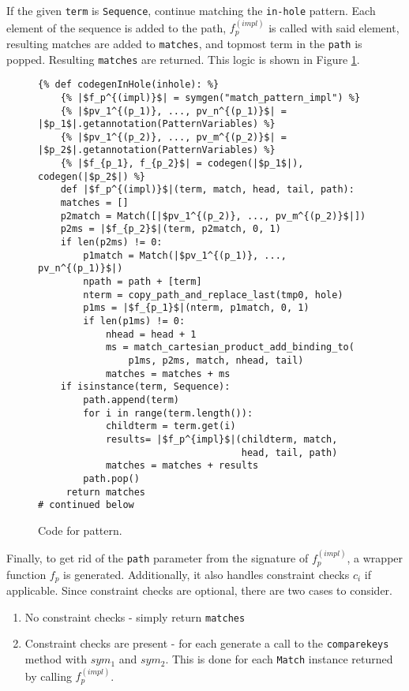 If the given \texttt{term} is \texttt{Sequence}, continue matching the \texttt{in-hole} pattern. Each element of the sequence is added to the path, $f_p^{(impl)}$ is called with said element, resulting matches are added to \texttt{matches}, and topmost term in the \texttt{path} is popped. Resulting \texttt{matches} are returned. This logic is shown in Figure \ref{pat-inhole-1}.

\begin{figure}[!htb]
\begin{verbatim}
{% def codegenInHole(inhole): %}
	{% |$f_p^{(impl)}$| = symgen("match_pattern_impl") %}
	{% |$pv_1^{(p_1)}, ..., pv_n^{(p_1)}$| = |$p_1$|.getannotation(PatternVariables) %}
	{% |$pv_1^{(p_2)}, ..., pv_m^{(p_2)}$| = |$p_2$|.getannotation(PatternVariables) %}
	{% |$f_{p_1}, f_{p_2}$| = codegen(|$p_1$|), codegen(|$p_2$|) %}
	def |$f_p^{(impl)}$|(term, match, head, tail, path):
	matches = []
	p2match = Match([|$pv_1^{(p_2)}, ..., pv_m^{(p_2)}$|])
	p2ms = |$f_{p_2}$|(term, p2match, 0, 1)
	if len(p2ms) != 0:
		p1match = Match(|$pv_1^{(p_1)}, ..., pv_n^{(p_1)}$|)
		npath = path + [term]
		nterm = copy_path_and_replace_last(tmp0, hole)
		p1ms = |$f_{p_1}$|(nterm, p1match, 0, 1)
		if len(p1ms) != 0:
			nhead = head + 1
			ms = match_cartesian_product_add_binding_to(
				p1ms, p2ms, match, nhead, tail)
			matches = matches + ms
	if isinstance(term, Sequence):
		path.append(term)
		for i in range(term.length()):
			childterm = term.get(i)
			results= |$f_p^{impl}$|(childterm, match,
								    head, tail, path)
			matches = matches + results
		path.pop()
	 return matches
# continued below
\end{verbatim}
\caption{Code for \PatternInHoleNoArg \space pattern.}
\label{pat-inhole-1}
\end{figure}

Finally, to get rid of the \texttt{path} parameter from the signature of $f_p^{(impl)}$, a wrapper function $f_p$ is generated. Additionally, it also handles constraint checks $c_i$ if applicable. Since constraint checks are optional, there are two cases to consider.

\begin{enumerate}
\item No constraint checks - simply return \texttt{matches}
\item Constraint checks are present - for each \PatternCheckConstraint \space generate a call to the \texttt{comparekeys} method with $sym_1$ and $sym_2$. This is done for each \texttt{Match} instance returned by calling $f_p^{(impl)}$.
\end{enumerate}

